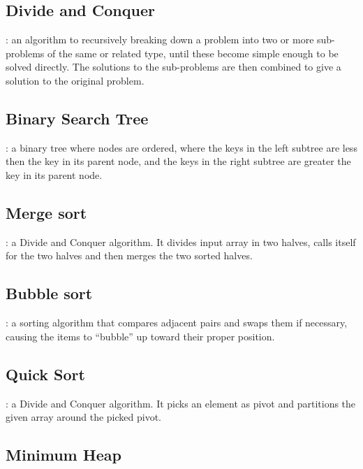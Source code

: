 \documentclass[]{book}
\begin{document}
\hypertarget{dnc}{%
\subsection{Divide and Conquer}\label{dnc}}

: an algorithm to recursively breaking down a problem into two or more sub-problems of the same or
related type, until these become simple enough to be solved directly. The solutions to the sub-problems are then
combined to give a solution to the original problem.

\hypertarget{bst}{%
\subsection{Binary Search Tree}\label{bst}}

: a binary tree where nodes are ordered, where the keys in the left subtree are less then the key in its
parent node, and the keys in the right subtree are greater the key in its parent node.

\hypertarget{ms}{%
\subsection{Merge sort}\label{ms}}

: a Divide and Conquer algorithm. It divides input array in two halves, calls itself for
the two halves and then merges the two sorted halves.

\hypertarget{bs}{%
\subsection{Bubble sort}\label{bs}}

: a sorting algorithm that compares adjacent pairs and swaps them if necessary, causing the items to
``bubble'' up toward their proper position.

\hypertarget{qs}{%
\subsection{Quick Sort}\label{qs}}

: a Divide and Conquer algorithm. It picks an element as pivot and partitions the given array around the
picked pivot.

\hypertarget{heap}{%
\subsection{Minimum Heap}\label{heap}}
\end{document}

